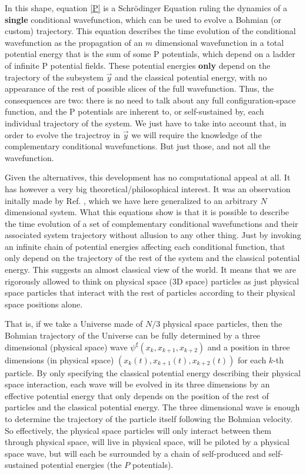 \documentclass[11pt, a4paper]{article} %
\begin{document}
In this shape, equation \eqref{P} is a Schrödinger Equation ruling the dynamics of a {\bf single} conditional wavefunction, which can be used to evolve a Bohmian (or custom) trajectory. This equation describes the time evolution of the conditional wavefunction as the propagation of an $m$ dimensional wavefunction in a total potential energy that is the sum of some P potentials, which depend on a ladder of infinite P potential fields. These potential energies {\bf only} depend on the trajectory of the subsystem $\vec{y}$ and the classical potential energy, with no appearance of the rest of possible slices of the full wavefunction. Thus, the consequences are two: there is no need to talk about any full configuration-space function, and the P potentials are inherent to, or self-sustained by, each individual trajectory of the system. We just have to take into account that, in order to evolve the trajectroy in $\vec{y}$ we will require the knowledge of the complementary conditional wavefunctions. But just those, and not all the wavefunction.

Given the alternatives, this development has no computational appeal at all. It has however a very big theoretical/philosophical interest. It was an observation initally made by Ref. \cite{Norsen}, which we have here generalized to an arbitrary $N$ dimensional system. What this equations show is that it is possible to describe the time evolution of a set of complementary conditional wavefunctions and their associated system trajectory without allusion to any other thing. Just by invoking an infinite chain of potential energies affecting each conditional function, that only depend on the trajectory of the rest of the system and the classical potential energy. This suggests an almost classical view of the world. It means that we are rigorously allowed to think on physical space (3D space) particles as just physical space particles that interact with the rest of particles according to their physical space positions alone. 

That is, if we take a Universe made of $N/3$ physical space particles, then the Bohmian trajectory of the Universe can be fully determined by a three dimensional (physical space) wave $\psi^\xi(x_k,x_{k+1},x_{k+2})$ and a position in three dimensions (in physical space) $(x_k(t),x_{k+1}(t),x_{k+2}(t))$ for each $k$-th particle. By only specifying the classical potential energy describing their physical space interaction, each wave will be evolved in its three dimensions by an effective potential energy that only depends on the position of the rest of particles and the classical potential energy. The three dimensional wave is enough to determine the trajectory of the particle itself following the Bohmian velocity. So effectively, the physical space particles will only interact between them through physical space, will live in physical space, will be piloted by a physical space wave, but will each be surrounded by a chain of self-produced and self-sustained potential energies (the $P$ potentials).
\end{document}

